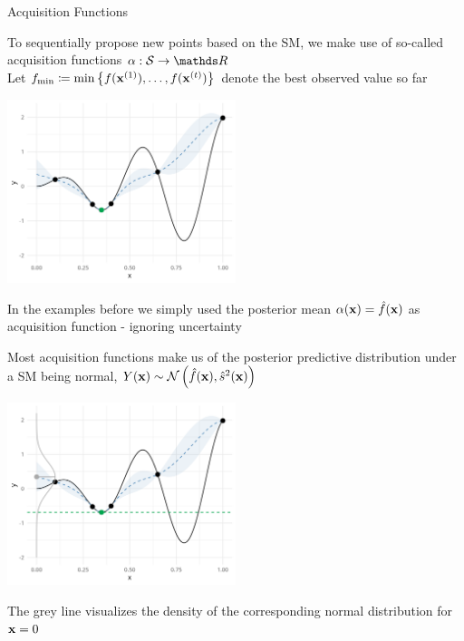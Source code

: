 \documentclass[11pt,compress,t,notes=noshow, xcolor=table]{beamer}
\begin{document}
\begin{vbframe}{Acquisition Functions}

To sequentially propose new points based on the SM, we make use of so-called acquisition functions $\alpha: \mathcal{S} \to \R$\\

Let $f_{\min} \coloneqq \min \left\{f(\mathbf{x}^{(1)}), \ldots, f(\mathbf{x}^{(t)})\right\}$ denote the best observed value so far

\vspace*{-0.2cm}

\begin{center}
  \includegraphics[width = 0.5\textwidth]{figure_man/bayesian_loop_2.png}
\end{center}

\vspace*{-0.3cm}

In the examples before we simply used the posterior mean $\alpha(\mathbf{x}) = \hat{f}(\mathbf{x})$ as acquisition function - ignoring uncertainty

\framebreak

Most acquisition functions make us of the posterior predictive distribution under a SM being normal, $Y(\mathbf{x}) \sim \mathcal{N}\left(\hat{f}(\mathbf{x}), \hat{s}^2(\mathbf{x})\right)$

\vspace*{-0.2cm}

\begin{center}
  \includegraphics[width = 0.5\textwidth]{figure_man/bayesian_loop_3.png}
\end{center}

The grey line visualizes the density of the corresponding normal distribution for $\mathbf{x} = 0$

\end{vbframe}
\end{document}

